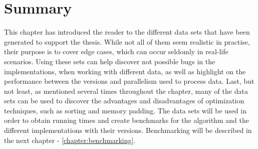 
\section*{Summary}
This chapter has introduced the reader to the different data sets that have been generated to support the thesis. While not all of them seem realistic in practise, their purpose is to cover edge cases, which can occur seldomly in real-life scenarios. Using these sets can help discover not possible bugs in the implementations, when working with different data, as well as highlight on the performance between the versions and parallelism used to process data. Last, but not least, as mentioned several times throughout the chapter, many of the data sets can be used to discover the advantages and disadvantages of optimization techniques, such as sorting and memory padding. The data sets will be used in order to obtain running times and create benchmarks for the algorithm and the different implementations with their versions. Benchmarking will be described in the next chapter - \ref{chapter:benchmarking}.